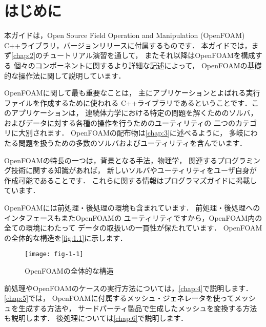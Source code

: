 \chapter{はじめに}
\label{chap:1}
本ガイドは，Open Source Field Operation and Manipulation
(OpenFOAM) C++ライブラリ，バージョン\OFversion リリースに付属するものです．
本ガイドでは，まず\autoref{chap:2}のチュートリアル演習を通して，
またそれ以降はOpenFOAMを構成する
個々のコンポーネントに関するより詳細な記述によって，
OpenFOAMの基礎的な操作法に関して説明しています．

OpenFOAMに関して最も重要なことは，
主にアプリケーションとよばれる実行ファイルを作成するために使われる
C++ライブラリであるということです．このアプリケーションは，
連続体力学における特定の問題を解くためのソルバ，
およびデータに対する各種の操作を行うためのユーティリティの
二つのカテゴリに大別されます．
OpenFOAMの配布物は\autoref{chap:3}に述べるように，
多岐にわたる問題を扱うための多数のソルバおよびユーティリティを含んでいます．

OpenFOAMの特長の一つは，背景となる手法，物理学，
関連するプログラミング技術に関する知識があれば，
新しいソルバやユーティリティをユーザ自身が作成可能であることです．
これらに関する情報はプログラマズガイドに掲載しています．

OpenFOAMには前処理・後処理の環境も含まれています．
前処理・後処理へのインタフェースもまたOpenFOAMの
ユーティリティですから，OpenFOAM内の全ての環境にわたって
データの取扱いの一貫性が保たれています．
OpenFOAMの全体的な構造を\autoref{fig:1.1}に示します．


\begin{figure}[ht]
 \texttt{[image: fig-1-1]}
 \caption{OpenFOAMの全体的な構造}
 \label{fig:1.1}
\end{figure}


前処理やOpenFOAMのケースの実行方法については，\autoref{chap:4}で説明します．
\autoref{chap:5}では，
OpenFOAMに付属するメッシュ・ジェネレータを使ってメッシュを生成する方法や，
サードパーティ製品で生成したメッシュを変換する方法も説明します．
後処理については\autoref{chap:6}で説明します．

